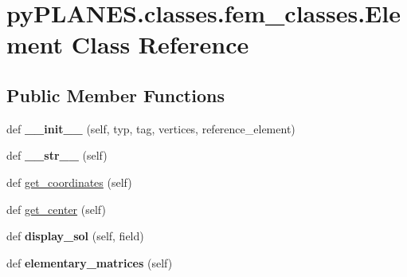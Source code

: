 \hypertarget{classpy_p_l_a_n_e_s_1_1classes_1_1fem__classes_1_1_element}{}\section{py\+P\+L\+A\+N\+E\+S.\+classes.\+fem\+\_\+classes.\+Element Class Reference}
\label{classpy_p_l_a_n_e_s_1_1classes_1_1fem__classes_1_1_element}
\subsection*{Public Member Functions}
\begin{DoxyCompactItemize}
\item 
\mbox{\label{classpy_p_l_a_n_e_s_1_1classes_1_1fem__classes_1_1_element_a97e569455738d42e030df2a6b1f17911}} 
def {\bfseries \+\_\+\+\_\+init\+\_\+\+\_\+} (self, typ, tag, vertices, reference\+\_\+element)
\item 
\mbox{\label{classpy_p_l_a_n_e_s_1_1classes_1_1fem__classes_1_1_element_afe6e7565839bf666a73899ca29cdb297}} 
def {\bfseries \+\_\+\+\_\+str\+\_\+\+\_\+} (self)
\item 
def \mbox{\hyperlink{classpy_p_l_a_n_e_s_1_1classes_1_1fem__classes_1_1_element_a1ebd212c04bb221d14aecbe36458dfda}{get\+\_\+coordinates}} (self)
\item 
def \mbox{\hyperlink{classpy_p_l_a_n_e_s_1_1classes_1_1fem__classes_1_1_element_ace2dc657fe00985caf3aebda50d27fb9}{get\+\_\+center}} (self)
\item 
\mbox{\label{classpy_p_l_a_n_e_s_1_1classes_1_1fem__classes_1_1_element_a77c10e9d25310d022a9a1b1276d2b017}} 
def {\bfseries display\+\_\+sol} (self, field)
\item 
\mbox{\label{classpy_p_l_a_n_e_s_1_1classes_1_1fem__classes_1_1_element_a065f56d42ea88e316e7001e321abf11f}} 
def {\bfseries elementary\+\_\+matrices} (self)
\end{DoxyCompactItemize}
